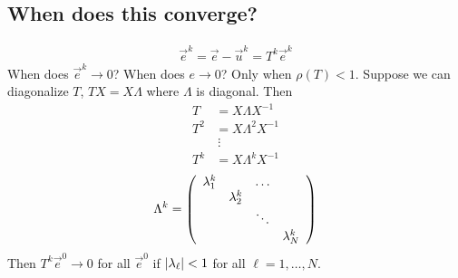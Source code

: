 \documentclass{article}
\begin{document}
            \subsection{When does this converge?}
                \begin{align*}
                    \vec{e}^{k} = \vec{e} - \vec{u}^{k} = T^k\vec{e}^k
                \end{align*}
                When does $\vec{e}^{k} \rightarrow 0$?  When does $e\rightarrow 0$?  Only when $\rho(T) < 1$.  Suppose we can diagonalize $T$, $TX = X\Lambda$ where $\Lambda$ is diagonal.  Then
                \begin{align*}
                    T &= X \Lambda X^{-1} \\
                    T^2 &= X\Lambda^2 X^{-1} \\
                    &\ \vdots \\
                    T^k &= X\Lambda^k X^{-1}
                \end{align*}
                \begin{align*}
                    \Lambda^k = \qty(\begin{array}{cccc}
                        \lambda_1^k & & \dots &  \\
                         & \lambda_2^k & & \\
                         & & \ddots & \\
                         & & & \lambda_N^k
                    \end{array})
                \end{align*}
                Then $T^k\vec{e}^0 \rightarrow 0$ for all $\vec{e}^0$ if $\abs{\lambda_\ell} < 1$ for all $\ell = 1, \dots, N$.
    
\end{document}
